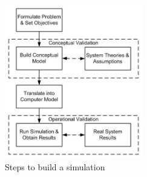 \begin{figure}
    \centering
    \includegraphics[width=6cm]{sections/pics/Steps_To_Build_Simulation}
    \caption{Steps to build a simulation}
    \label{fig:steps_simulation}
\end{figure}










